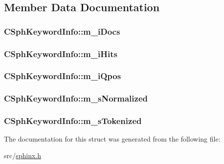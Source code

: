 \subsection{Member Data Documentation}
\hypertarget{structCSphKeywordInfo_afeea74f7fbd4c698d502a913bf8d5039}{
\subsubsection[{m\-\_\-i\-Docs}]{ C\-Sph\-Keyword\-Info\-::m\-\_\-i\-Docs}}\label{structCSphKeywordInfo_afeea74f7fbd4c698d502a913bf8d5039}
\hypertarget{structCSphKeywordInfo_a56952dd5ff67045e587a5fe45707e4a1}{
\subsubsection[{m\-\_\-i\-Hits}]{ C\-Sph\-Keyword\-Info\-::m\-\_\-i\-Hits}}\label{structCSphKeywordInfo_a56952dd5ff67045e587a5fe45707e4a1}
\hypertarget{structCSphKeywordInfo_af3a27ad40ed697a6bd6199592ae8b486}{
\subsubsection[{m\-\_\-i\-Qpos}]{ C\-Sph\-Keyword\-Info\-::m\-\_\-i\-Qpos}}\label{structCSphKeywordInfo_af3a27ad40ed697a6bd6199592ae8b486}
\hypertarget{structCSphKeywordInfo_aec58183f5458757a7a74db246672142c}{
\subsubsection[{m\-\_\-s\-Normalized}]{ C\-Sph\-Keyword\-Info\-::m\-\_\-s\-Normalized}}\label{structCSphKeywordInfo_aec58183f5458757a7a74db246672142c}
\hypertarget{structCSphKeywordInfo_a023e6c0d5cf3ecca130aaf7e4361703d}{
\subsubsection[{m\-\_\-s\-Tokenized}]{ C\-Sph\-Keyword\-Info\-::m\-\_\-s\-Tokenized}}\label{structCSphKeywordInfo_a023e6c0d5cf3ecca130aaf7e4361703d}


The documentation for this struct was generated from the following file\-:\begin{DoxyCompactItemize}
\item 
src/\hyperlink{sphinx_8h}{sphinx.\-h}\end{DoxyCompactItemize}
